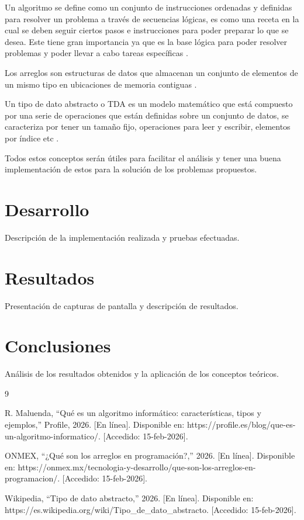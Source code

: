 \documentclass[letterpaper,12pt,oneside]{article}
\begin{document}
Un algoritmo se define como un conjunto de instrucciones ordenadas y definidas para resolver un problema a través de secuencias lógicas, es como una receta en la cual se deben seguir ciertos pasos e instrucciones para poder preparar lo que se desea. Este tiene gran importancia ya que es la base lógica para poder resolver problemas y poder llevar a cabo tareas específicas \cite{algoritmo}.

Los arreglos son estructuras de datos que almacenan un conjunto de elementos de un mismo tipo en ubicaciones de memoria contiguas \cite{arreglos}.

Un tipo de dato abstracto o TDA es un modelo matemático que está compuesto por una serie de operaciones que están definidas sobre un conjunto de datos, se caracteriza por tener un tamaño fijo, operaciones para leer y escribir, elementos por índice etc \cite{tda}.

Todos estos conceptos serán útiles para facilitar el análisis y tener una buena implementación de estos para la solución de los problemas propuestos.

\section{Desarrollo}

Descripción de la implementación realizada y pruebas efectuadas.

\section{Resultados}

Presentación de capturas de pantalla y descripción de resultados.

\section{Conclusiones}

Análisis de los resultados obtenidos y la aplicación de los conceptos teóricos.

\begin{thebibliography}{9}

R. Maluenda, ``Qué es un algoritmo informático: características, tipos y ejemplos,'' Profile, 2026. [En línea]. Disponible en: https://profile.es/blog/que-es-un-algoritmo-informatico/. [Accedido: 15-feb-2026].

ONMEX, ``¿Qué son los arreglos en programación?,'' 2026. [En línea]. Disponible en: https://onmex.mx/tecnologia-y-desarrollo/que-son-los-arreglos-en-programacion/. [Accedido: 15-feb-2026].

Wikipedia, ``Tipo de dato abstracto,'' 2026. [En línea]. Disponible en: https://es.wikipedia.org/wiki/Tipo_de_dato_abstracto. [Accedido: 15-feb-2026].

\end{thebibliography}
\end{document}
